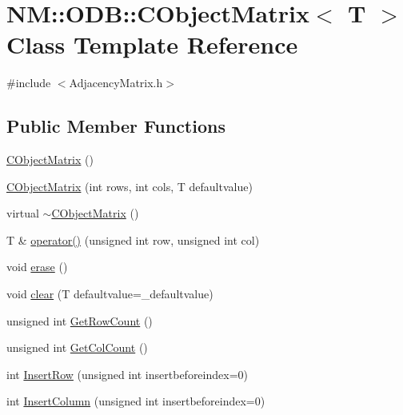 \hypertarget{class_n_m_1_1_o_d_b_1_1_c_object_matrix}{}\section{N\+M\+:\+:O\+D\+B\+:\+:C\+Object\+Matrix$<$ T $>$ Class Template Reference}
\label{class_n_m_1_1_o_d_b_1_1_c_object_matrix}


{\ttfamily \#include $<$Adjacency\+Matrix.\+h$>$}

\subsection*{Public Member Functions}
\begin{DoxyCompactItemize}
\item 
\hyperlink{class_n_m_1_1_o_d_b_1_1_c_object_matrix_a2f702b1c3b0edfc871c42d85fb13e991}{C\+Object\+Matrix} ()
\item 
\hyperlink{class_n_m_1_1_o_d_b_1_1_c_object_matrix_a1c31e501cad45149394a6dac84bc4214}{C\+Object\+Matrix} (int rows, int cols, T defaultvalue)
\item 
virtual \hyperlink{class_n_m_1_1_o_d_b_1_1_c_object_matrix_a475f0dcfe1e32a5c7cf6201925f49398}{$\sim$\+C\+Object\+Matrix} ()
\item 
T \& \hyperlink{class_n_m_1_1_o_d_b_1_1_c_object_matrix_a39bab1a03e295f7d6f7b7d564bc81ec6}{operator()} (unsigned int row, unsigned int col)
\item 
void \hyperlink{class_n_m_1_1_o_d_b_1_1_c_object_matrix_ae438bd3d06da216c4b8a80559fd35e71}{erase} ()
\item 
void \hyperlink{class_n_m_1_1_o_d_b_1_1_c_object_matrix_aea13ec76f15561bba1e97758a3f0c5f4}{clear} (T defaultvalue=\+\_\+defaultvalue)
\item 
unsigned int \hyperlink{class_n_m_1_1_o_d_b_1_1_c_object_matrix_ac2f8c2889c99c7ab2ca180c2db07db85}{Get\+Row\+Count} ()
\item 
unsigned int \hyperlink{class_n_m_1_1_o_d_b_1_1_c_object_matrix_adf265fffcfa3501f1142cadebafabeeb}{Get\+Col\+Count} ()
\item 
int \hyperlink{class_n_m_1_1_o_d_b_1_1_c_object_matrix_a6aadd0bff6c92b0eec0362e862b1ccf5}{Insert\+Row} (unsigned int insertbeforeindex=0)
\item 
int \hyperlink{class_n_m_1_1_o_d_b_1_1_c_object_matrix_a121375ca4820cc58cdc70e868d167c72}{Insert\+Column} (unsigned int insertbeforeindex=0)
\end{DoxyCompactItemize}


